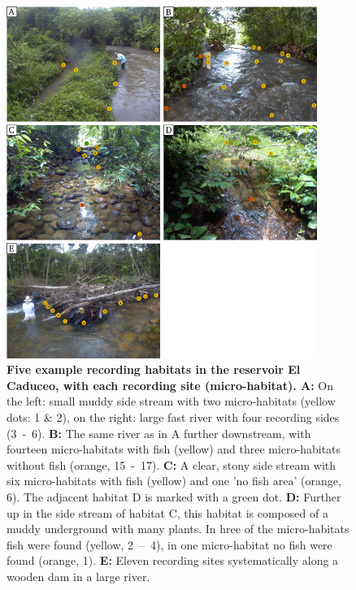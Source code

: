 \begin{figure}[H]
    \centering
    \includegraphics[width = 0.9\textwidth]{pictures/Methods/all_habitats.png}
    \caption{\textbf{Five example recording habitats in the reservoir El Caduceo, with each recording site (micro-habitat). A:} On the left: small muddy side stream with two micro-habitats (yellow dots: 1 \& 2), on the right: large fast river with four recording sides (3~-~6). \textbf{B:} The same river as in A further downstream, with fourteen micro-habitats with fish (yellow) and three micro-habitats without fish (orange, 15~-~17). \textbf{C:} A clear, stony side stream with six micro-habitats with fish (yellow) and one 'no fish area' (orange, 6). The adjacent habitat D is marked with a green dot. \textbf{D:} Further up in the side stream of habitat C, this habitat is composed of a muddy underground with many plants. In hree of the micro-habitats fish were found (yellow, 2~–~4), in one micro-habitat no fish were found (orange, 1). \textbf{E:} Eleven recording sites systematically along a wooden dam in a large river.}
    \label{fig:habitats}
\end{figure}

